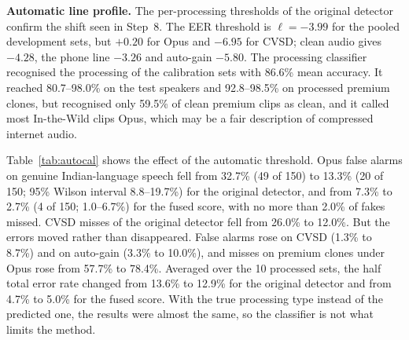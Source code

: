\documentclass[10pt,a4paper,twocolumn]{article}
\newcommand{\llr}{\ell}
\begin{document}
\textbf{Automatic line profile.} The per-processing thresholds of the original detector confirm the shift seen in Step~8. The EER threshold is $\llr=-3.99$ for the pooled development sets, but $+0.20$ for Opus and $-6.95$ for CVSD; clean audio gives $-4.28$, the phone line $-3.26$ and auto-gain $-5.80$. The processing classifier recognised the processing of the calibration sets with 86.6\% mean accuracy. It reached 80.7--98.0\% on the test speakers and 92.8--98.5\% on processed premium clones, but recognised only 59.5\% of clean premium clips as clean, and it called most In-the-Wild clips Opus, which may be a fair description of compressed internet audio.

Table~\ref{tab:autocal} shows the effect of the automatic threshold. Opus false alarms on genuine Indian-language speech fell from 32.7\% (49 of 150) to 13.3\% (20 of 150; 95\% Wilson interval 8.8--19.7\%) for the original detector, and from 7.3\% to 2.7\% (4 of 150; 1.0--6.7\%) for the fused score, with no more than 2.0\% of fakes missed. CVSD misses of the original detector fell from 26.0\% to 12.0\%. But the errors moved rather than disappeared. False alarms rose on CVSD (1.3\% to 8.7\%) and on auto-gain (3.3\% to 10.0\%), and misses on premium clones under Opus rose from 57.7\% to 78.4\%. Averaged over the 10 processed sets, the half total error rate changed from 13.6\% to 12.9\% for the original detector and from 4.7\% to 5.0\% for the fused score. With the true processing type instead of the predicted one, the results were almost the same, so the classifier is not what limits the method.
\end{document}
